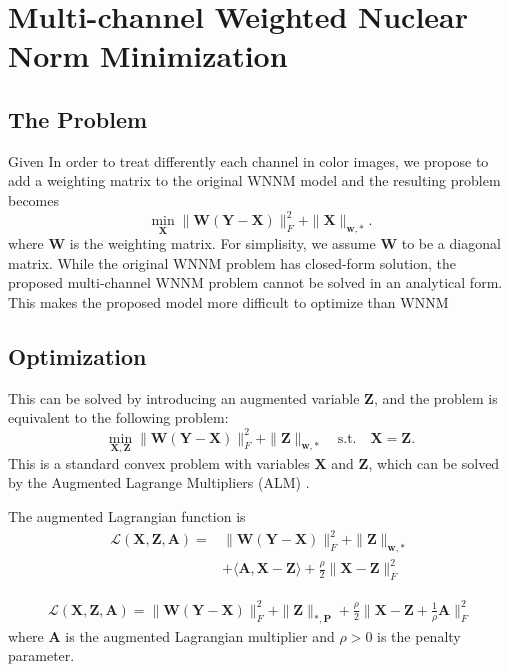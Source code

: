\documentclass[10pt,twocolumn,letterpaper]{article}
\begin{document}
\section{Multi-channel Weighted Nuclear Norm Minimization}

\subsection{The Problem}
Given 
In order to treat differently each channel in color images, we propose to add a weighting matrix to the original WNNM model and the resulting problem becomes
\begin{equation}
\min_{\mathbf{X}}\|\mathbf{W}(\mathbf{Y}-\mathbf{X})\|_{F}^{2}
+ 
\|\mathbf{X}\|_{\bm{w},*}.
\end{equation}
where $\mathbf{W}$ is the weighting matrix. For simplisity, we assume $\mathbf{W}$ to be a diagonal matrix. 
While the original WNNM problem has closed-form solution, the proposed multi-channel WNNM problem cannot be solved in an analytical form. This makes the proposed model more difficult to optimize than WNNM 

\subsection{Optimization}
This can be solved by introducing an augmented variable $\mathbf{Z}$, and the problem is equivalent to the following problem:
\begin{equation}
\min_{\mathbf{X},\mathbf{Z}}\|\mathbf{W}(\mathbf{Y}-\mathbf{X})\|_{F}^{2}
+
\|\mathbf{Z}\|_{\bm{w},*}
\quad
\text{s.t.}
\quad
\mathbf{X}=\mathbf{Z}.
\end{equation}
This is a standard convex  problem with variables $\mathbf{X}$ and $\mathbf{Z}$, which can be solved by 
the Augmented Lagrange Multipliers (ALM) \cite{bertsekas1999nonlinear,LADMAP}. 

The augmented Lagrangian function is 
\begin{equation}
\begin{split}
\mathcal{L}(\mathbf{X},\mathbf{Z},\mathbf{A})
=
&\|\mathbf{W}(\mathbf{Y}-\mathbf{X})\|_{F}^{2}
+
\|\mathbf{Z}\|_{\bm{w},*}
\\
&
+
\langle
\mathbf{A},\mathbf{X}-\mathbf{Z}
\rangle
+
\frac{\rho}{2}
\|\mathbf{X}-\mathbf{Z}\|_{F}^{2}
\end{split}
\end{equation}

\begin{equation}
\begin{split}
\mathcal{L}(\mathbf{X},\mathbf{Z},\mathbf{A})
=
\|\mathbf{W}(\mathbf{Y}-\mathbf{X})\|_{F}^{2}
+
\|\mathbf{Z}\|_{*,\mathbf{P}}
+
\frac{\rho}{2}
\|\mathbf{X}-\mathbf{Z}+\frac{1}{\rho}\mathbf{A}\|_{F}^{2}
\end{split}
\end{equation}
where $\mathbf{A}$ is the augmented Lagrangian multiplier and $\rho>0$ is the penalty parameter.
\end{document}
